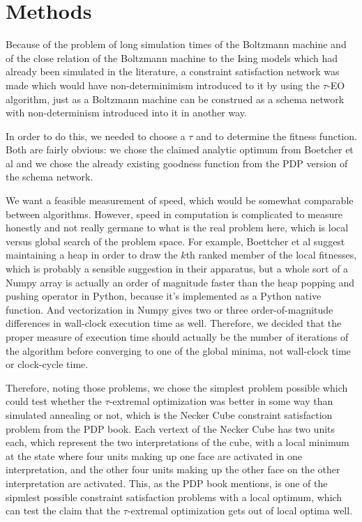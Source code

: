 \documentclass[12pt]{article}
\begin{document}
\section{Methods}


Because of the problem of long simulation times of the Boltzmann machine and of the close relation of the Boltzmann machine to the Ising models which had already been simulated in the literature, a constraint satisfaction network was made which would have non-determinimism introduced to it by using the $\tau$-EO algorithm, just as a Boltzmann machine can be construed as a schema network with non-determinism introduced into it in another way.

In order to do this, we needed to choose a $\tau$ and to determine the fitness function. Both are fairly obvious: we chose the claimed analytic optimum from Boetcher et al and we chose the already existing goodness function from the PDP version of the schema network.

We want a feasible measurement of speed, which would be somewhat comparable between algorithms. However, speed in computation is complicated to measure honestly and not really germane to what is the real problem here, which is local versus global search of the problem space. For example, Boettcher et al suggest maintaining a heap in order to draw the $k$th ranked member of the local fitnesses, which is probably a sensible suggestion in their apparatus, but a whole sort of a Numpy array is actually an order of magnitude faster than the heap popping and pushing operator in Python, because it's implemented as a Python native function. And vectorization in Numpy gives two or three order-of-magnitude differences in wall-clock execution time as well. Therefore, we decided that the proper measure of execution time should actually be the number of iterations of the algorithm before converging to one of the global minima, not wall-clock time or clock-cycle time.

Therefore, noting those problems, we chose the simplest problem possible which could test whether the $\tau$-extremal optimization was better in some way than simulated annealing or not, which is the Necker Cube constraint satisfaction problem from the PDP book. Each vertext of the Necker Cube has two units each, which represent the two interpretations of the cube, with a local minimum at the state where four units making up one face are activated in one interpretation, and the other four units making up the other face on the other interpretation are activated. This, as the PDP book mentions, is one of the sipmlest possible constraint satisfaction problems with a local optimum, which can test the claim that the $\tau$-extremal optimization gets out of local optima well.
\end{document}
